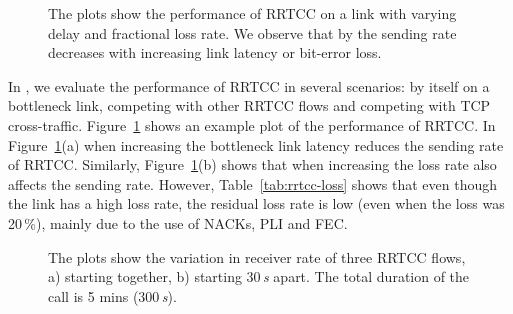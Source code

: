 \begin{figure}[!t]
  \centerline{
   }
   \centerline{
  }
  \caption{The plots show the performance of RRTCC on a link with varying
  delay and fractional loss rate. We observe that by the sending rate
  decreases with increasing link latency or bit-error loss. }
  \label{fig:rrtcc-single}
\end{figure}

\begin{table}[!t]
\begin{center}{
  }
\end{center}
\caption{RRTCC: Metrics for a bottleneck with different packet loss rates.}
\label{tab:rrtcc-loss}
\end{table}

In , we evaluate the performance of RRTCC in several
scenarios: by itself on a bottleneck link, competing with other RRTCC flows
and competing with TCP cross-traffic. Figure~\ref{fig:rrtcc-single} shows an
example plot of the performance of RRTCC. In Figure~\ref{fig:rrtcc-single}(a) when
increasing the bottleneck link latency reduces the sending rate of RRTCC.
Similarly, Figure~\ref{fig:rrtcc-single}(b) shows that when increasing the loss
rate also affects the sending rate. However, Table~\ref{tab:rrtcc-loss} shows
that even though the link has a high loss rate, the residual loss rate is low
(even when the loss was 20\,\%), mainly due to the use of NACKs, PLI and FEC.


\begin{figure}[!t]
\centerline{
  }
  \centerline{
  }
   \caption{The plots show the variation in receiver rate of three RRTCC
   flows, a) starting together, b) starting 30\,\emph{s} apart. The total duration of
   the call is 5 mins (300\,\emph{s}).}
\label{fig:rrtcc-self-fair}
\end{figure}

